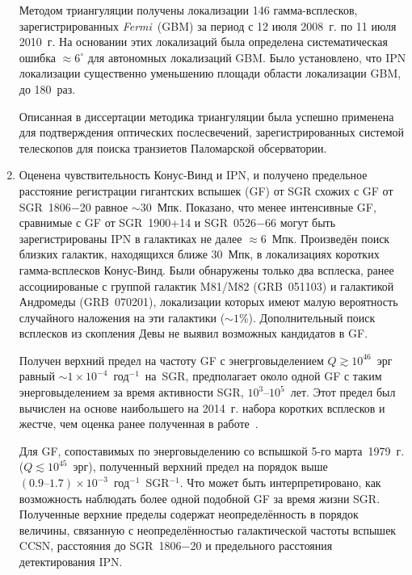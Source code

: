 \begin{enumerate}
    Методом триангуляции получены локализации 146 гамма-всплесков,
    зарегистрированных \textit{Fermi}~(GBM) за период с 12 июля 2008~г. по 11 июля 2010~г.
    На основании этих локализаций была определена систематическая ошибка $\approx 6^\circ$
    для автономных локализаций GBM. Было установлено, что IPN локализации 
    существенно уменьшению площади области локализации GBM, до 180~раз.  

    Описанная в диссертации методика триангуляции была успешно применена для 
    подтверждения оптических послесвечений, зарегистрированных системой телескопов 
    для поиска транзиетов Паломарской обсерватории.
    
\item Оценена чувствительность Конус-Винд и IPN, и получено 
    предельное расстояние регистрации гигантских вспышек (GF) от SGR схожих с GF от SGR~1806$-$20 
    равное $\sim 30$~Мпк. Показано, что менее интенсивные GF, сравнимые 
    с GF от SGR~1900+14 и SGR~0526$-$66 могут быть зарегистрированы IPN в галактиках 
    не далее $\approx 6$~Мпк.
    Произведён поиск близких галактик, находящихся ближе 30~Мпк, в локализациях 
    коротких гамма-всплесков Конус-Винд. Были обнаружены только два всплеска, ранее 
    ассоциированые с группой галактик M81/M82 (GRB~051103) и галактикой Андромеды (GRB~070201),
    локализации которых имеют малую вероятность случайного наложения на эти галактики ($\sim 1$\%).
    Дополнительный поиск всплесков из скопления Девы не выявил возможных кандидатов в GF.
    
    Получен верхний предел на частоту GF с энегрговыделением $Q \gtrsim 10^{46}$~эрг равный
    $\sim 1 \times 10^{-4}$~год$^{-1}$~на~SGR, предполагает 
    около одной GF с таким энерговыделением за время активности SGR, $10^3\textrm{--}10^5$~лет. 
    Этот предел был вычислен на основе наибольшего на 2014~г.  
    набора коротких всплесков и жестче, чем оценка ранее полученная в работе~\citep{Ofek_2007ApJ}.
    
    Для GF, сопоставимых по энерговыделению со вспышкой 5-го марта~1979~г. ($Q \lesssim 10^{45}$~эрг), 
    полученный верхний предел на порядок выше $(0.9\textrm{--}1.7)\times 10^{-3}$~год$^{-1}$~SGR$^{-1}$. 
    Что может быть интерпретировано, как возможность наблюдать более одной подобной GF за время жизни SGR.
    Полученные верхние пределы содержат неопределённость в порядок величины, связанную с
    неопределённостью галактической частоты вспышек CCSN, расстояния до SGR~1806$-$20 и
    предельного расстояния детектирования IPN.
    

\end{enumerate}
